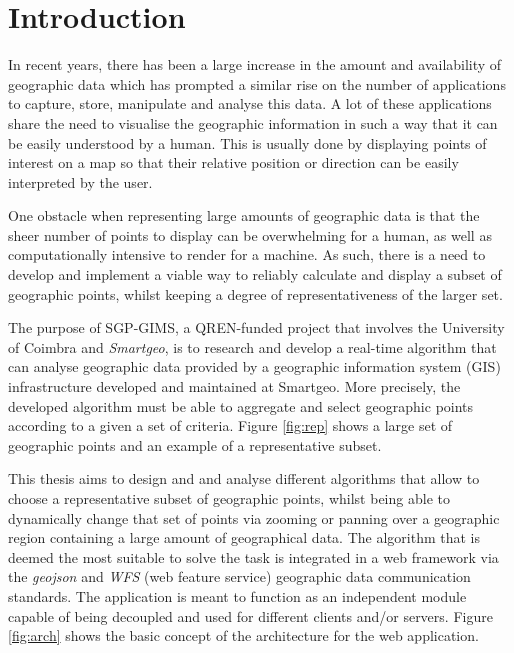 \pagestyle{mypagestyle}

\setcounter{page}{1}

\cleardoublepage
\chapter{Introduction}
\label{chap:intro}
\vspace{-15pt}
In recent years, there has been a large increase in the amount and availability of geographic data which has prompted a similar rise on the number of applications to capture, store, manipulate and analyse this data.
A lot of these applications share the need to visualise the geographic information in such a way that it can be easily understood by a human.
This is usually done by displaying points of interest on a map so that their relative position or direction can be easily interpreted by the user.

One obstacle when representing large amounts of geographic data is that the sheer number of points to display can be overwhelming for a human, as well as computationally intensive to render for a machine. As such, there is a need to develop and implement a viable way to reliably calculate and display a subset of geographic points, whilst keeping a degree of representativeness of the larger set.

The purpose of SGP-GIMS, a QREN-funded project that involves the University of Coimbra and \emph{Smartgeo}, is to research and develop a real-time algorithm that can analyse geographic data provided by a geographic information system (GIS) infrastructure developed and maintained at Smartgeo. More precisely, the developed algorithm must be able to aggregate and select geographic points according to a given a set of criteria. Figure \ref{fig:rep} shows a large set of geographic points and an example of a representative subset.



This thesis aims to design and and analyse different algorithms that allow to choose a representative subset of geographic points, whilst being able to dynamically change that set of points via zooming or panning over a geographic region containing a large amount of geographical data. 
The algorithm that is deemed the most suitable to solve the task is integrated in a web framework via the \emph{geojson} and \emph{WFS} (web feature service) geographic data communication standards. The application is meant to function as an independent module capable of being decoupled and used for different clients and/or servers. Figure \ref{fig:arch} shows the basic concept of the architecture for the web application.

